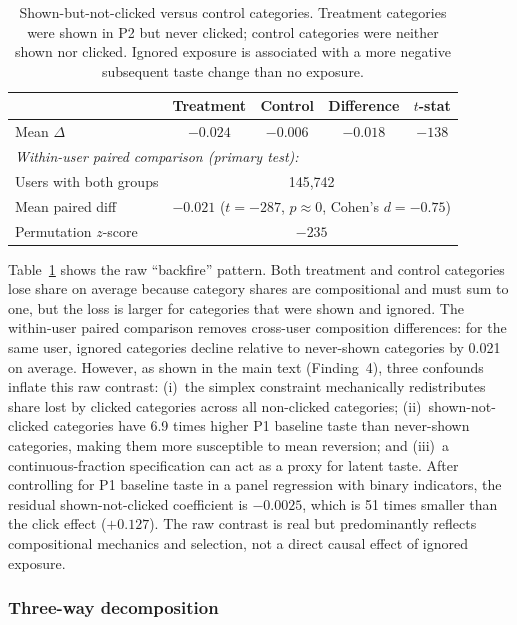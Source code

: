 \documentclass[11pt]{article}
\begin{document}
\begin{table}[ht]
\centering
\caption{Shown-but-not-clicked versus control categories. Treatment categories were shown in P2 but never clicked; control categories were neither shown nor clicked. Ignored exposure is associated with a more negative subsequent taste change than no exposure.}
\label{tab:backfire}
\begin{tabular}{lcccc}
\toprule
 & Treatment & Control & Difference & $t$-stat \\
\midrule
Mean $\Delta$ & $-0.024$ & $-0.006$ & $-0.018$ & $-138$ \\
\midrule
\multicolumn{5}{l}{\textit{Within-user paired comparison (primary test):}} \\
Users with both groups & \multicolumn{4}{c}{145,742} \\
Mean paired diff & \multicolumn{4}{c}{$-0.021$ ($t = -287$, $p \approx 0$, Cohen's $d = -0.75$)} \\
Permutation $z$-score & \multicolumn{4}{c}{$-235$} \\
\bottomrule
\end{tabular}
\end{table}
\FloatBarrier

Table~\ref{tab:backfire} shows the raw ``backfire'' pattern. Both treatment and control categories lose share on average because category shares are compositional and must sum to one, but the loss is larger for categories that were shown and ignored. The within-user paired comparison removes cross-user composition differences: for the same user, ignored categories decline relative to never-shown categories by 0.021 on average. However, as shown in the main text (Finding~4), three confounds inflate this raw contrast: (i)~the simplex constraint mechanically redistributes share lost by clicked categories across all non-clicked categories; (ii)~shown-not-clicked categories have 6.9 times higher P1 baseline taste than never-shown categories, making them more susceptible to mean reversion; and (iii)~a continuous-fraction specification can act as a proxy for latent taste. After controlling for P1 baseline taste in a panel regression with binary indicators, the residual shown-not-clicked coefficient is $-0.0025$, which is 51 times smaller than the click effect ($+0.127$). The raw contrast is real but predominantly reflects compositional mechanics and selection, not a direct causal effect of ignored exposure.

\subsubsection{Three-way decomposition}
\end{document}
